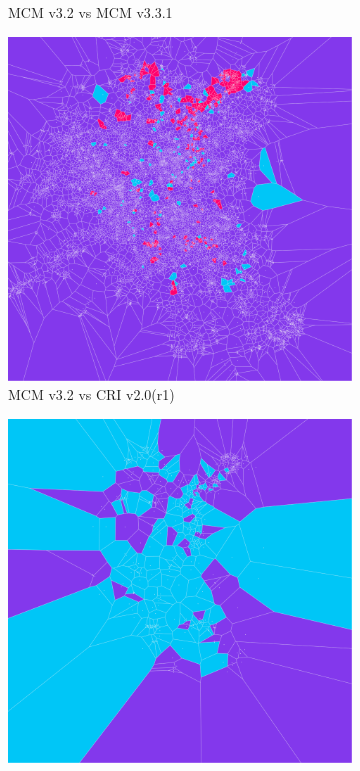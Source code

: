 \begin{figure}[H]
\begin{subfigure}[b]{.49\textwidth}
         \caption{MCM v3.2 vs MCM v3.3.1}
         \label{fig:m2to3}
     \end{subfigure}
     \begin{subfigure}[b]{.49\textwidth}
         \centering \includegraphics[width=\textwidth]{cr1_m32.png}
         \caption{MCM v3.2 vs CRI v2.0(r1)}
         \label{fig:m2tocri1}
     \end{subfigure}
     \begin{subfigure}[b]{.49\textwidth}
         \centering \includegraphics[width=\textwidth]{cr1_cr5.png}

\end{subfigure}
\end{figure}
